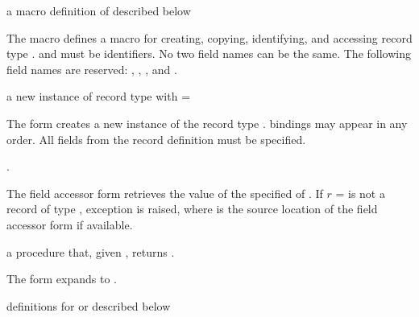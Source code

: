\begin{syntax}
\end{syntax}
\expandsto{} a macro definition of  described below

The  macro defines a macro for creating,
copying, identifying, and accessing record type . 
and  \etc{} must be identifiers. No two field names can be
the same. The following field names are reserved: ,
, , and .

\begin{syntax}
\end{syntax}
\returns{} a new instance of record type  with  =
 \etc{}

The  form creates a new instance of the record type
.  bindings may appear in any order. All fields
from the record definition must be specified.

\begin{syntax}
\end{syntax}
\returns{} .

The field accessor form retrieves the value of the specified
 of . If $r$ =  is not a record
of type , exception  is raised, where  is the source location of the
field accessor form if available.

\begin{syntax}
\end{syntax}
\returns{} a procedure that, given , returns .

The  form expands to .

\begin{syntax}
\end{syntax}
\expandsto{} definitions for  \etc{} or  \etc{} described below

